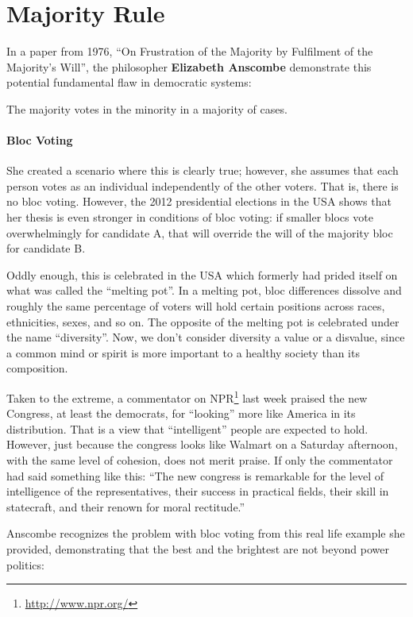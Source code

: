 \section{Majority Rule}

In a paper from 1976, ``On Frustration of the Majority by Fulfilment of the Majority's Will'', the philosopher \textbf{Elizabeth Anscombe} demonstrate this potential fundamental flaw in democratic systems:

\begin{quotex}
The majority votes in the minority in a majority of cases.
\end{quotex}


\paragraph{Bloc Voting}


She created a scenario where this is clearly true; however, she assumes that each person votes as an individual independently of the other voters. That is, there is no bloc voting. However, the 2012 presidential elections in the USA shows that her thesis is even stronger in conditions of bloc voting: if smaller blocs vote overwhelmingly for candidate A, that will override the will of the majority bloc for candidate B.

Oddly enough, this is celebrated in the USA which formerly had prided itself on what was called the ``melting pot''. In a melting pot, bloc differences dissolve and roughly the same percentage of voters will hold certain positions across races, ethnicities, sexes, and so on. The opposite of the melting pot is celebrated under the name ``diversity''. Now, we don't consider diversity a value or a disvalue, since a common mind or spirit is more important to a healthy society than its composition.

Taken to the extreme, a commentator on NPR\footnote{\url{http://www.npr.org/}} last week praised the new Congress, at least the democrats, for ``looking'' more like America in its distribution. That is a view that ``intelligent'' people are expected to hold. However, just because the congress looks like Walmart on a Saturday afternoon, with the same level of cohesion, does not merit praise. If only the commentator had said something like this: ``The new congress is remarkable for the level of intelligence of the representatives, their success in practical fields, their skill in statecraft, and their renown for moral rectitude.''

Anscombe recognizes the problem with bloc voting from this real life example she provided, demonstrating that the best and the brightest are not beyond power politics:

